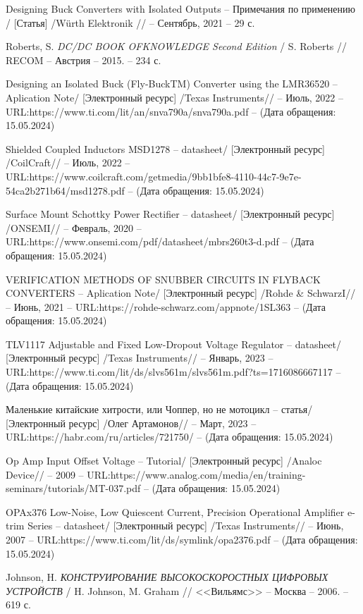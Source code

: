 \begin{thebibliography}{00}
Designing Buck Converters with Isolated Outputs 
-- Примечания по применению /
[Статья] /Würth Elektronik // -- Сентябрь, 2021 -- 29 с.

 Roberts, S.
\emph{DC/DC BOOK OFKNOWLEDGE Second Edition} / S. Roberts // RECOM --
Австрия -- 2015. -- 234 с.

 Designing an Isolated Buck (Fly-BuckTM) Converter using
the LMR36520
  -- Aplication Note/
  [Электронный ресурс] /Texas Instruments// -- Июль, 2022 -- 
  URL:https://www.ti.com/lit/an/snva790a/snva790a.pdf
  -- (Дата обращения: 15.05.2024)


 Shielded Coupled Inductors MSD1278
-- datasheet/
[Электронный ресурс] /CoilCraft// -- Июль, 2022 -- 
URL:https://www.coilcraft.com/getmedia/9bb1bfe8-4110-44c7-9e7e-54ca2b271b64/msd1278.pdf
-- (Дата обращения: 15.05.2024)

 Surface Mount Schottky Power Rectifier
-- datasheet/
[Электронный ресурс] /ONSEMI// -- Февраль, 2020 -- 
URL:https://www.onsemi.com/pdf/datasheet/mbrs260t3-d.pdf
-- (Дата обращения: 15.05.2024)

 VERIFICATION METHODS OF SNUBBER CIRCUITS IN FLYBACK
CONVERTERS
-- Aplication Note/
[Электронный ресурс] /Rohde \& SchwarzI// -- Июнь, 2021 -- 
URL:https://rohde-schwarz.com/appnote/1SL363
-- (Дата обращения: 15.05.2024)

 TLV1117 Adjustable and Fixed Low-Dropout Voltage Regulator
  -- datasheet/
  [Электронный ресурс] /Texas Instruments// -- Январь, 2023 -- 
  URL:https://www.ti.com/lit/ds/slvs561m/slvs561m.pdf?ts=1716086667117
  -- (Дата обращения: 15.05.2024)

 Маленькие китайские хитрости, или Чоппер, но не мотоцикл
-- статья/
[Электронный ресурс] /Олег Артамонов// -- Март, 2023 -- 
URL:https://habr.com/ru/articles/721750/
-- (Дата обращения: 15.05.2024)

 Op Amp Input Offset Voltage 
-- Tutorial/
[Электронный ресурс] /Analoc Device// --  2009 -- 
URL:https://www.analog.com/media/en/training-seminars/tutorials/MT-037.pdf
-- (Дата обращения: 15.05.2024)

 OPAx376 Low-Noise, Low Quiescent Current, Precision Operational Amplifier
e-trim Series
-- datasheet/
[Электронный ресурс] /Texas Instruments// -- Июнь, 2007 -- 
URL:https://www.ti.com/lit/ds/symlink/opa2376.pdf
-- (Дата обращения: 15.05.2024)

 Johnson, H.
\emph{КОНСТРУИРОВАНИЕ ВЫСОКОСКОРОСТНЫХ ЦИФРОВЫХ УСТРОЙСТВ} / H. Johnson, M. Graham // <<Вильямс>> --
Москва -- 2006. -- 619 с.

\end{thebibliography}
